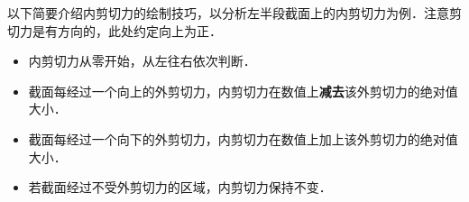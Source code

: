 以下简要介绍内剪切力的绘制技巧，以分析左半段截面上的内剪切力为例．注意剪切力是有方向的，此处约定向上为正．
\begin{itemize}
\item 内剪切力从零开始，从左往右依次判断．
\item 截面每经过一个向上的外剪切力，内剪切力在数值上\textbf{减去}该外剪切力的绝对值大小．
\item 截面每经过一个向下的外剪切力，内剪切力在数值上加上该外剪切力的绝对值大小．
\item 若截面经过不受外剪切力的区域，内剪切力保持不变．
\end{itemize}
